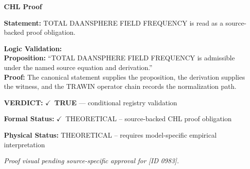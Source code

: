 \vspace{0.45em}
\noindent\textbf{CHL Proof}\par
\textbf{Statement:} TOTAL DAANSPHERE FIELD FREQUENCY is read as a source-backed proof obligation.

\textbf{Logic Validation:}\\
\textbf{Proposition:} ``TOTAL DAANSPHERE FIELD FREQUENCY is admissible under the named source equation and derivation.''\\
\textbf{Proof:} The canonical statement supplies the proposition, the derivation supplies the witness, and the TRAWIN operator chain records the normalization path.

\textbf{VERDICT:} \ensuremath{\checkmark}\ \textbf{TRUE} --- conditional registry validation

\textbf{Formal Status:} \ensuremath{\checkmark}\ THEORETICAL -- source-backed CHL proof obligation

\textbf{Physical Status:} THEORETICAL -- requires model-specific empirical interpretation
\par\vspace{0.45em}
\par
\vfill
\begingroup\footnotesize\itshape
Proof visual pending source-specific approval for [ID 0983].
\par\endgroup
\vfill
\endgroup
\endgroup
